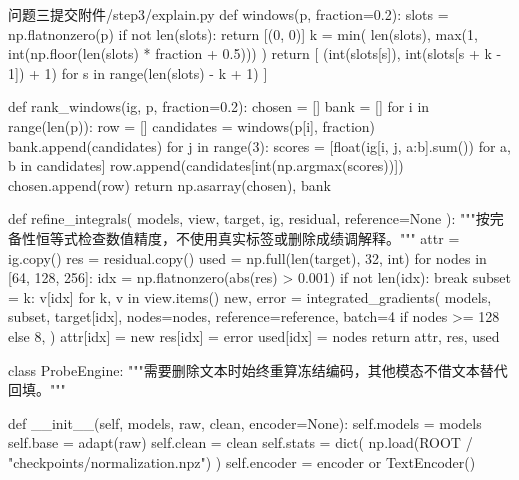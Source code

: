 \begin{appendices}
\begin{Python}{问题三提交附件/step3/explain.py}
def windows(p, fraction=0.2):
    slots = np.flatnonzero(p)
    if not len(slots):
        return [(0, 0)]
    k = min(
        len(slots), max(1, int(np.floor(len(slots) * fraction + 0.5)))
    )
    return [
        (int(slots[s]), int(slots[s + k - 1]) + 1)
        for s in range(len(slots) - k + 1)
    ]


def rank_windows(ig, p, fraction=0.2):
    chosen = []
    bank = []
    for i in range(len(p)):
        row = []
        candidates = windows(p[i], fraction)
        bank.append(candidates)
        for j in range(3):
            scores = [float(ig[i, j, a:b].sum()) for a, b in candidates]
            row.append(candidates[int(np.argmax(scores))])
        chosen.append(row)
    return np.asarray(chosen), bank


def refine_integrals(
    models, view, target, ig, residual, reference=None
):
    """按完备性恒等式检查数值精度，不使用真实标签或删除成绩调解释。"""
    attr = ig.copy()
    res = residual.copy()
    used = np.full(len(target), 32, int)
    for nodes in [64, 128, 256]:
        idx = np.flatnonzero(abs(res) > 0.001)
        if not len(idx):
            break
        subset = {k: v[idx] for k, v in view.items()}
        new, error = integrated_gradients(
            models,
            subset,
            target[idx],
            nodes=nodes,
            reference=reference,
            batch=4 if nodes >= 128 else 8,
        )
        attr[idx] = new
        res[idx] = error
        used[idx] = nodes
    return attr, res, used


class ProbeEngine:
    """需要删除文本时始终重算冻结编码，其他模态不借文本替代回填。"""

    def __init__(self, models, raw, clean, encoder=None):
        self.models = models
        self.base = adapt(raw)
        self.clean = clean
        self.stats = dict(
            np.load(ROOT / "checkpoints/normalization.npz")
        )
        self.encoder = encoder or TextEncoder()


\end{Python}
\end{appendices}
